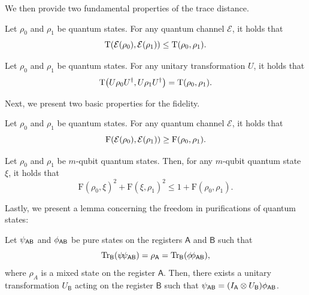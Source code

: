 \documentclass[10pt,a4paper]{article}
\numberwithin{equation}{section}
\numberwithin{figure}{section}
\DeclarePairedDelimiter\rbra{\lparen}{\rparen}
\let\ket\relax\DeclarePairedDelimiter\ket{\lvert}{\rangle}
\let\bra\relax\DeclarePairedDelimiter\bra{\langle}{\rvert}
\newcommand{\ketbra}[2]{\ensuremath{\ket{#1}\!\bra{#2}}}
\newcommand{\Tr}{\mathrm{Tr}}
\newcommand{\td}{\mathrm{T}}
\newcommand{\F}{\mathrm{F}}
\newcommand{\calE}{\mathcal{E}}
\newcommand{\sfA}{\mathsf{A}}
\newcommand{\sfB}{\mathsf{B}}
\begin{document}
We then provide two fundamental properties of the trace distance.

\begin{lemma}
    \label{lemma:trace-distance-data-processing}
    Let $\rho_0$ and $\rho_1$ be quantum states. For any quantum channel $\calE$, it holds that
    \[ \td\rbra*{\calE(\rho_0), \calE(\rho_1)} \leq \td(\rho_0,\rho_1). \]
\end{lemma}

\begin{lemma}
    \label{lemma:trace-distance-unitary-invariance}
    Let $\rho_0$ and $\rho_1$ be quantum states. For any unitary transformation $U$, it holds that
    \[ \td\rbra*{U\rho_0 U^{\dagger}, U\rho_1 U^{\dagger}} = \td(\rho_0,\rho_1). \]
\end{lemma}

Next, we present two basic properties for the fidelity. 

\begin{lemma}
    \label{lemma:fidelity-data-processing}
    Let $\rho_0$ and $\rho_1$ be quantum states. For any quantum channel $\calE$, it holds that
    \[ \F\rbra*{\calE(\rho_0), \calE(\rho_1)} \geq \F(\rho_0,\rho_1). \]
\end{lemma}

\begin{lemma}
    \label{lemma:sum-of-squared-fidelity}
    Let $\rho_0$ and $\rho_1$ be $m$-qubit quantum states. Then, for any $m$-qubit quantum state $\xi$, it holds that
    \[ \F(\rho_0,\xi)^2 + \F(\xi,\rho_1)^2 \leq 1 + \F(\rho_0,\rho_1). \]
\end{lemma}

Lastly, we present a lemma concerning the freedom in purifications of quantum states: 
\begin{lemma}
    \label{lemma:unitary-equivalent-in-purifications}
    Let $\ket{\psi}_{\sfA\sfB}$ and $\ket{\phi}_{\sfA\sfB}$ be pure states on the registers $\sfA$ and $\sfB$ such that 
    \[\Tr_{\sfB}\rbra*{\ketbra{\psi}{\psi}_{\sfA\sfB}} = \rho_{\sfA} = \Tr_{\sfB}\rbra*{\ketbra{\phi}{\phi}_{\sfA\sfB}},\] where $\rho_A$ is a mixed state on the register $\sfA$. Then, there exists a unitary transformation $U_{\sfB}$ acting on the register $\sfB$ such that $\ket{\psi}_{\sfA\sfB} = \rbra*{I_{\sfA} \otimes U_{\sfB}} \ket{\phi}_{\sfA\sfB}$. 
\end{lemma}
\end{document}

